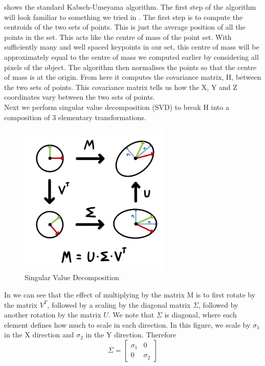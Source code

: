  shows the standard Kabsch-Umeyama algorithm. The first step of the algorithm will look familiar to something we tried in . The first step is to compute the centroids of the two sets of points. This is just the average position of all the points in the set. This acts like the centre of mass of the point set. With sufficiently many and well spaced keypoints in our set, this centre of mass will be approximately equal to the centre of mass we computed earlier by considering all pixels of the object. The algorithm then normalises the points so that the centre of mass is at the origin. From here it computes the covariance matrix, H, between the two sets of points. This covariance matrix tells us how the X, Y and Z coordinates vary between the two sets of points.\\

Next we perform singular value decomposition (SVD) to break H into a composition of 3 elementary transformations.\\

\begin{figure}[h]
    \centering
    \includegraphics[width=0.65\textwidth]{figures/SVD.jpg}
    \caption{Singular Value Decomposition}
    \label{fig:svd}
\end{figure}

In  we can see that the effect of multiplying by the matrix M is to first rotate by the matrix $V^T$, followed by a scaling by the diagonal matrix $\Sigma$, followed by another rotation by the matrix $U$. We note that $\Sigma$ is diagonal, where each element defines how much to scale in each direction. In this figure, we scale by $\sigma_1$ in the X direction and $\sigma_2$ in the Y direction. Therefore
$$\Sigma = \begin{bmatrix}
  \sigma_1 & 0\\
  0 & \sigma_2
\end{bmatrix} $$

